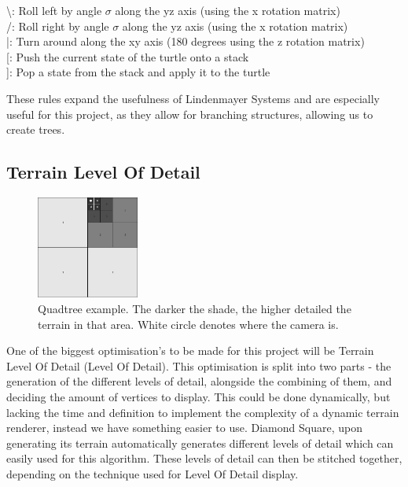 \documentclass[a4paper,10pt]{report}
\begin{document}
\textbackslash: Roll left by angle $\sigma$ along the yz axis (using the x rotation matrix)\\

/: Roll right by angle $\sigma$ along the yz axis (using the x rotation matrix)\\

|: Turn around along the xy axis (180 degrees using the z rotation matrix)\\

[: Push the current state of the turtle onto a stack\\

]: Pop a state from the stack and apply it to the turtle\medskip

These rules expand the usefulness of Lindenmayer Systems and are especially useful for this project, as they allow for branching structures, allowing us to create trees.

\clearpage
\subsection{Terrain Level Of Detail}

\begin{figure}[h!]
    \centering
  \includegraphics[width=0.3\textwidth]{Images/Charts/QuadTree.png}
 \caption{Quadtree example. The darker the shade, the higher detailed the terrain in that area. White circle denotes where the camera is.}
 \label{fig:quad_tree}
\end{figure}

One of the biggest optimisation's to be made for this project will be Terrain Level Of Detail (Level Of Detail). This optimisation is split into two parts - the generation of the different levels of detail, alongside the combining of them, and deciding the amount of vertices to display. This could be done dynamically, but lacking the time and definition  to implement the complexity of a dynamic terrain renderer, instead we have something easier to use. Diamond Square, upon generating its terrain automatically generates different levels of detail which can easily used for this algorithm. These levels of detail can then be stitched together, depending on the technique used for Level Of Detail display. \medskip
\end{document}
